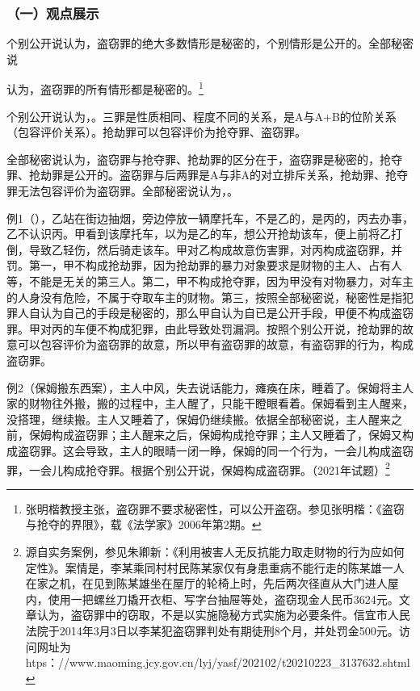 \subsubsection*{（一）观点展示}

个别公开说认为，盗窃罪的绝大多数情形是秘密的，个别情形是公开的。全部秘密说

认为，盗窃罪的所有情形都是秘密的。\footnote{张明楷教授主张，盗窃罪不要求秘密性，可以公开盗窃。参见张明楷：《盗窃与抢夺的界限》，载《法学家》2006年第2期。}

个别公开说认为，。三罪是性质相同、程度不同的关系，是A与A+B的位阶关系（包容评价关系）。抢劫罪可以包容评价为抢夺罪、盗窃罪。

全部秘密说认为，盗窃罪与抢夺罪、抢劫罪的区分在于，盗窃罪是秘密的，抢夺罪、抢劫罪是公开的。盗窃罪与后两罪是A与非A的对立排斥关系，抢劫罪、抢夺罪无法包容评价为盗窃罪。全部秘密说认为，。

例1（），乙站在街边抽烟，旁边停放一辆摩托车，不是乙的，是丙的，丙去办事，乙不认识丙。甲看到该摩托车，以为是乙的车，想公开抢劫该车，便上前将乙打倒，导致乙轻伤，然后骑走该车。甲对乙构成故意伤害罪，对丙构成盗窃罪，并罚。第一，甲不构成抢劫罪，因为抢劫罪的暴力对象要求是财物的主人、占有人等，不能是无关的第三人。第二，甲不构成抢夺罪，因为甲没有对物暴力，对车主的人身没有危险，不属于夺取车主的财物。第三，按照全部秘密说，秘密性是指犯罪人自认为自己的手段是秘密的，那么甲自认为自已是公开手段，甲便不构成盗窃罪。甲对丙的车便不构成犯罪，由此导致处罚漏洞。按照个别公开说，抢劫罪的故意可以包容评价为盗窃罪的故意，所以甲有盗窃罪的故意，有盗窃罪的行为，构成盗窃罪。

例2（保姆搬东西案），主人中风，失去说话能力，瘫痪在床，睡着了。保姆将主人家的财物往外搬，搬的过程中，主人醒了，只能干瞪眼看着。保姆看到主人醒来，没搭理，继续搬。主人又睡着了，保姆仍继续搬。依据全部秘密说，主人醒来之前，保姆构成盗窃罪；主人醒来之后，保姆构成抢夺罪；主人又睡着了，保姆又构成盗窃罪。这会导致，主人的眼晴一闭一睁，保姆的同一个行为，一会儿构成盗窃罪，一会儿构成抢夺罪。根据个别公开说，保姆构成盗窃罪。（2021年试题）\footnote{源自实务案例，参见朱卿新：《利用被害人无反抗能力取走财物的行为应如何定性》。案情是，李某乘同村村民陈某家仅有身患重病不能行走的陈某雄一人在家之机，在见到陈某雄坐在屋厅的轮椅上时，先后两次径直从大门进人屋内，使用一把螺丝刀撬开衣柜、写字台抽屉等处，盗窃现金人民币3624元。文章认为，盗窃罪中的窃取，不是以实施隐秘方式实施为必要条件。信宜市人民法院于2014年3月3日以李某犯盗窃罪判处有期徒刑8个月，并处罚金500元。访问网址为htps：//www.maoming.jcy.gov.cn/lyj/yasf/202102/t20210223\_3137632.shtml}

